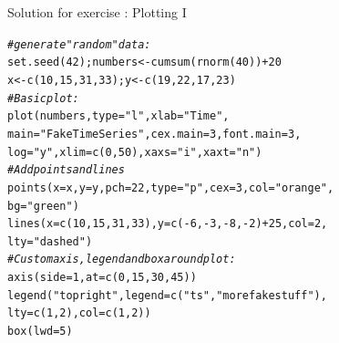 \documentclass[xcolor=table,           xcolor=dvipsnames]{beamer}\usepackage[]{graphicx}\usepackage[]{color}
\makeatletter
\newcommand{\hlnum}[1]{\textcolor[rgb]{0,0,0}{#1}}
\newcommand{\hlstr}[1]{\textcolor[rgb]{0.545,0.137,0.137}{#1}}
\newcommand{\hlcom}[1]{\textcolor[rgb]{0,0.392,0}{\textit{#1}}}
\newcommand{\hlopt}[1]{\textcolor[rgb]{0,0,0}{#1}}
\newcommand{\hlstd}[1]{\textcolor[rgb]{0,0,0}{#1}}
\newcommand{\hlkwb}[1]{\textcolor[rgb]{0,0,0}{#1}}
\newcommand{\hlkwc}[1]{\textcolor[rgb]{1,0,1}{#1}}
\newcommand{\hlkwd}[1]{\textcolor[rgb]{0,0,1}{#1}}
\newenvironment{kframe}{%
 \def\at@end@of@kframe{}%
 \ifinner\ifhmode%
  \def\at@end@of@kframe{\end{minipage}}%
  \begin{minipage}{\columnwidth}%
 \fi\fi%
 \def\FrameCommand##1{\hskip\@totalleftmargin \hskip-\fboxsep
 \colorbox{shadecolor}{##1}\hskip-\fboxsep
     \hskip-\linewidth \hskip-\@totalleftmargin \hskip\columnwidth}%
 \MakeFramed {\advance\hsize-\width
   \@totalleftmargin\z@ \linewidth\hsize
   \@setminipage}}%
 {\par\unskip\endMakeFramed%
 \at@end@of@kframe}
\newenvironment{knitrout}{}{} %
\newcounter{exercisecount}
\makeatother
\begin{document}
\begin{frame}[fragile]{Solution for exercise : Plotting I}
\begin{knitrout}\small
{}\color{fgcolor}\begin{kframe}
\begin{alltt}
\hlcom{# generate "random" data:}
\hlkwd{set.seed}\hlstd{(}\hlnum{42}\hlstd{) ; numbers} \hlkwb{<-} \hlkwd{cumsum}\hlstd{(}\hlkwd{rnorm}\hlstd{(}\hlnum{40}\hlstd{))} \hlopt{+} \hlnum{20}
\hlstd{x} \hlkwb{<-} \hlkwd{c}\hlstd{(}\hlnum{10}\hlstd{,} \hlnum{15}\hlstd{,} \hlnum{31}\hlstd{,} \hlnum{33}\hlstd{); y} \hlkwb{<-} \hlkwd{c}\hlstd{(}\hlnum{19}\hlstd{,} \hlnum{22}\hlstd{,} \hlnum{17}\hlstd{,} \hlnum{23}\hlstd{)}
\hlcom{# Basic plot:}
\hlkwd{plot}\hlstd{(numbers,} \hlkwc{type}\hlstd{=}\hlstr{"l"}\hlstd{,} \hlkwc{xlab}\hlstd{=}\hlstr{"Time"}\hlstd{,}
     \hlkwc{main}\hlstd{=}\hlstr{"Fake Time Series"}\hlstd{,} \hlkwc{cex.main}\hlstd{=}\hlnum{3}\hlstd{,} \hlkwc{font.main}\hlstd{=}\hlnum{3}\hlstd{,}
     \hlkwc{log}\hlstd{=}\hlstr{"y"}\hlstd{,} \hlkwc{xlim}\hlstd{=}\hlkwd{c}\hlstd{(}\hlnum{0}\hlstd{,}\hlnum{50}\hlstd{),} \hlkwc{xaxs}\hlstd{=}\hlstr{"i"}\hlstd{,} \hlkwc{xaxt}\hlstd{=}\hlstr{"n"} \hlstd{)}
\hlcom{# Add points and lines}
\hlkwd{points}\hlstd{(}\hlkwc{x}\hlstd{=x,} \hlkwc{y}\hlstd{=y,} \hlkwc{pch}\hlstd{=}\hlnum{22}\hlstd{,} \hlkwc{type}\hlstd{=}\hlstr{"p"}\hlstd{,} \hlkwc{cex}\hlstd{=}\hlnum{3}\hlstd{,} \hlkwc{col}\hlstd{=}\hlstr{"orange"}\hlstd{,}
      \hlkwc{bg}\hlstd{=}\hlstr{"green"}\hlstd{)}
\hlkwd{lines}\hlstd{(}\hlkwc{x}\hlstd{=}\hlkwd{c}\hlstd{(}\hlnum{10}\hlstd{,} \hlnum{15}\hlstd{,} \hlnum{31}\hlstd{,} \hlnum{33}\hlstd{),} \hlkwc{y}\hlstd{=}\hlkwd{c}\hlstd{(}\hlopt{-}\hlnum{6}\hlstd{,} \hlopt{-}\hlnum{3}\hlstd{,} \hlopt{-}\hlnum{8}\hlstd{,} \hlopt{-}\hlnum{2}\hlstd{)}\hlopt{+}\hlnum{25}\hlstd{,} \hlkwc{col}\hlstd{=}\hlnum{2}\hlstd{,}
      \hlkwc{lty}\hlstd{=}\hlstr{"dashed"}\hlstd{)}
\hlcom{# Custom axis, legend and box around plot:}
\hlkwd{axis}\hlstd{(}\hlkwc{side}\hlstd{=}\hlnum{1}\hlstd{,} \hlkwc{at}\hlstd{=}\hlkwd{c}\hlstd{(}\hlnum{0}\hlstd{,} \hlnum{15}\hlstd{,} \hlnum{30}\hlstd{,} \hlnum{45}\hlstd{)  )}
\hlkwd{legend}\hlstd{(}\hlstr{"topright"}\hlstd{,} \hlkwc{legend}\hlstd{=}\hlkwd{c}\hlstd{(}\hlstr{"ts"}\hlstd{,} \hlstr{"more fake stuff"}\hlstd{),}
       \hlkwc{lty}\hlstd{=}\hlkwd{c}\hlstd{(}\hlnum{1}\hlstd{,}\hlnum{2}\hlstd{),} \hlkwc{col}\hlstd{=}\hlkwd{c}\hlstd{(}\hlnum{1}\hlstd{,}\hlnum{2}\hlstd{) )}
\hlkwd{box}\hlstd{(}\hlkwc{lwd}\hlstd{=}\hlnum{5}\hlstd{)}
\end{alltt}
\end{kframe}
\end{knitrout}
\end{frame}
\end{document}
